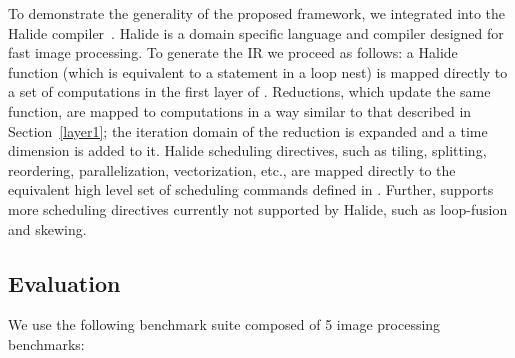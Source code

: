 To demonstrate the generality of the proposed framework, we integrated \framework into the Halide compiler~\cite{halide_12}. Halide is a domain specific language and compiler designed for fast image processing.
To generate the \framework{} IR we proceed as follows: a Halide function (which is equivalent to a statement in a loop nest) is mapped directly to a set of computations in the first layer of \framework.  Reductions, which update the same function, are mapped to \framework computations in a way similar to that described in Section~\ref{layer1}; the iteration domain of the reduction is expanded and a time dimension is added to it.  Halide scheduling directives, such as tiling, splitting, reordering, parallelization, vectorization, etc., are mapped directly to the equivalent high level set of scheduling commands defined in \framework.  Further, \framework supports more scheduling directives currently not supported by Halide, such as loop-fusion and skewing.

\subsection{Evaluation}

We use the following benchmark suite composed of 5 image processing benchmarks:

